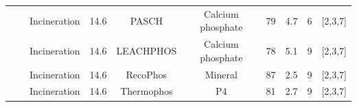 \documentclass[authoryear]{elsarticle}
\begin{document}
\begin{table}[h]
{\begin{threeparttable}
\begin{tabular}{@{}cccccccccc@{}}
			&                                                                                                                                                         & Incineration                                                                     & 14.6                                   & PASCH                                                                                    & Calcium phosphate                                                                 & 79                                                                                    & 4.7                                  & 6                                                            &   [2,3,7] \\
			&                                                                                                                                                         & Incineration                                                                     & 14.6                                   & LEACHPHOS                                                                                & Calcium phosphate                                                                 & 78                                                                                    & 5.1                                  & 9                                                            &  [2,3,7]  \\
			&                                                                                                                                                         & Incineration                                                                     & 14.6                                   & RecoPhos                                                                                 & Mineral                                                                           & 87                                                                                    & 2.5                                  & 9                                                            &  [2,3,7]  \\
			&                                                                                                                                                         & Incineration                                                                     & 14.6                                   & Thermophos                                                                               & P4                                                                                & 81                                                                                    & 2.7                                  & 9                                                            &  [2,3,7]  \\ \cmidrule(l){1-10}

\end{tabular}
\end{threeparttable}}
\end{table}
\end{document}
